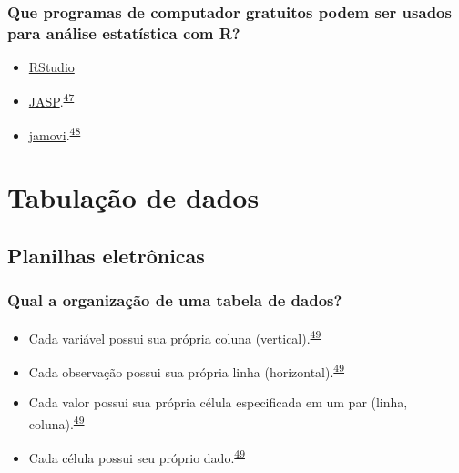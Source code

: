 \documentclass[
]{book}
\begin{document}
\hypertarget{que-programas-de-computador-gratuitos-podem-ser-usados-para-anuxe1lise-estatuxedstica-com-r}{%
\subsection{Que programas de computador gratuitos podem ser usados para análise estatística com R?}\label{que-programas-de-computador-gratuitos-podem-ser-usados-para-anuxe1lise-estatuxedstica-com-r}}

\begin{itemize}
\item
  \href{https://posit.co/downloads/}{RStudio}
\item
  \href{https://jasp-stats.org}{JASP}.\textsuperscript{\protect\hyperlink{ref-love2019}{47}}
\item
  \href{https://www.jamovi.org}{jamovi}.\textsuperscript{\protect\hyperlink{ref-sahin2020}{48}}
\end{itemize}

\hypertarget{tabulacao-dados}{%
\chapter{\texorpdfstring{\textbf{Tabulação de dados}}{Tabulação de dados}}\label{tabulacao-dados}}

\hypertarget{planilhas}{%
\section{Planilhas eletrônicas}\label{planilhas}}

\hypertarget{qual-a-organizauxe7uxe3o-de-uma-tabela-de-dados}{%
\subsection{Qual a organização de uma tabela de dados?}\label{qual-a-organizauxe7uxe3o-de-uma-tabela-de-dados}}

\begin{itemize}
\item
  Cada variável possui sua própria coluna (vertical).\textsuperscript{\protect\hyperlink{ref-tierney2023}{49}}
\item
  Cada observação possui sua própria linha (horizontal).\textsuperscript{\protect\hyperlink{ref-tierney2023}{49}}
\item
  Cada valor possui sua própria célula especificada em um par (linha, coluna).\textsuperscript{\protect\hyperlink{ref-tierney2023}{49}}
\item
  Cada célula possui seu próprio dado.\textsuperscript{\protect\hyperlink{ref-tierney2023}{49}}
\end{itemize}
\end{document}
